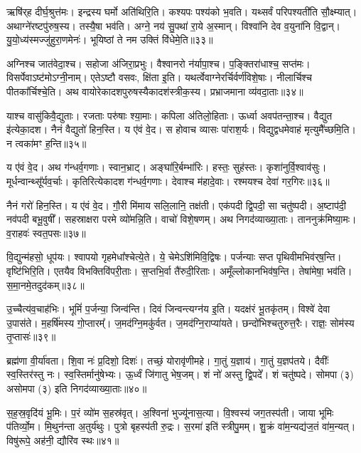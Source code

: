 ऋषि॑र्‌ह दीर्घ॒श्रुत्त॑मः। इन्द्रस्य घर्मो अति॑थिरि॒ति। 
कश्यपः पश्य॑को भ॒वति। यथ्सर्वं परिपश्यती॑ति सौ॒क्ष्म्यात्। 
अथाग्ने॑रष्टपु॑रुष॒स्य। तस्यै॒षा भव॑ति। 
अग्ने॒ नय॑ सु॒पथा॑ रा॒ये अ॒स्मान्। विश्वा॑नि देव व॒युना॑नि वि॒द्वान्। 
यु॒यो॒ध्य॑स्मज्जु॑हुरा॒णमेनः॑। भूयिष्ठां ते नम उक्तिं वि॑धेमे॒ति॥३३॥\anuvakamend


अग्निश्च जात॑वेदा॒श्च। सहोजा अ॑जिरा॒प्रभुः। वैश्वानरो न॑र्यापा॒श्च। 
प॒ङ्क्तिरा॑धाश्च॒ सप्त॑मः। विसर्पेवाऽष्ट॑मोऽग्नी॒नाम्। 
एतेऽष्टौ वसवः, क्षि॑ता इ॒ति। यथर्त्वेवाग्नेरर्चिर्वर्ण॑विशे॒षाः। 
नीलार्चिश्च पीतका᳚र्चिश्चे॒ति। अथ वायोरेकादशपुरुषस्यैका\-दश॑स्त्रीक॒स्य। 
प्रभ्राजमाना व्य॑वदा॒ताः॥३४॥


याश्च वासु॑किवै॒द्युताः। रजताः परु॑षाः श्या॒माः। कपिला अ॑तिलो॒हिताः। 
ऊर्ध्वा अवप॑तन्ता॒श्च। वैद्युत इ॑त्येका॒दश। नैनं वैद्युतो॑ हिन॒स्ति। 
य ए॑वं वे॒द। स होवाच व्यासः पा॑राश॒र्यः। 
विद्युद्वधमेवाहं मृत्युमै᳚च्छमि॒ति। न त्वका॑मꣳ ह॒न्ति॥३५॥


य ए॑वं वे॒द। अथ ग॑न्धर्व॒गणाः। स्वान॒भ्राट्। 
अङ्घा॑रि॒र्बम्भा॑रिः। हस्तः॒ सुह॑स्तः। कृशा॑नुर्वि॒श्वाव॑सुः। 
मूर्धन्वान्थ्सू᳚र्यव॒र्चाः। कृतिरित्येकादश ग॑न्धर्व॒गणाः। 
देवाश्च म॑हादे॒वाः। रश्मयश्च देवा॑ गर॒गिरः॥३६॥


नैनं गरो॑ हिन॒स्ति। य ए॑वं वे॒द। 
गौ॒री मि॑माय सलि॒लानि॒ तक्ष॑ती। एक॑पदी द्वि॒पदी॒ सा चतु॑ष्पदी। 
अ॒ष्टाप॑दी॒ नव॑पदी बभू॒वुषी᳚। सहस्राक्षरा परमे व्यो॑मन्नि॒ति। 
वाचो॑ विशे॒षणम्। अथ निगद॑व्याख्या॒ताः। 
ताननुक्र॑मिष्या॒मः। व॒राहवः॑ स्वत॒पसः॥३७॥

वि॒द्युन्म॑हसो॒ धूप॑यः। श्वापयो गृहमेधा᳚श्चेत्ये॒ते। 
ये॒ चेमेऽशि॑मिवि॒\-द्विषः। पर्जन्याः सप्त पृथिवीमभिव॑र्‌ष॒न्ति। 
वृष्टि॑भिरि॒ति। एतयैव विभक्तिवि॑परी॒ताः। स॒प्तभि॒र्वा तै॑रुदी॒रिताः। 
अमूँल्लोकान\-भिव॑\ur{}ष॒न्ति। तेषा॑मेषा॒ भव॑ति। स॒मा॒नमे॒तदुद॑कम्॥३८॥

उ॒च्चैत्य॑व॒चाह॑भिः। भूमिं॑ प॒र्जन्या॒ जिन्व॑न्ति। दिवं जिन्वन्त्यग्न॑य इ॒ति। 
यदक्ष॑रं भू॒तकृ॑तम्। विश्वे॑ देवा उ॒पास॑ते। म॒हर्\mbox{}षि॑मस्य गो॒प्तारम्᳚। 
ज॒मद॑ग्नि॒मकु॑र्वत। ज॒मद॑ग्नि॒\-राप्या॑यते। 
छन्दो॑भिश्चतुरुत्त॒रैः। राज्ञः॒ सोम॑स्य तृ॒प्तासः॑॥३९॥

ब्रह्म॑णा वी॒र्या॑वता। शि॒वा नः॑ प्र॒दिशो॒ दिशः॑। 
तच्छं॒ योरावृ॑णीमहे। गा॒तुं य॒ज्ञाय॑। गा॒तुं य॒ज्ञप॑तये। 
दैवीः᳚ स्व॒स्तिर॑स्तु नः। स्व॒स्तिर्मानु॑षेभ्यः। ऊ॒र्ध्वं जि॑गातु भेष॒जम्। 
शं नो॑ अस्तु द्वि॒पदे᳚। शं चतु॑ष्पदे। 
सोमपा (३) असोमपा (३) इति निगद॑व्याख्या॒ताः॥४०॥\anuvakamend


स॒ह॒स्र॒वृदि॑यं भू॒मिः। प॒रं व्यो॑म स॒हस्र॑वृत्। अ॒श्विना॑ भुज्यू॑नास॒त्या। 
वि॒श्वस्य॑ जग॒तस्प॑ती। जाया भूमिः प॑तिर्व्यो॒म। मि॒थुन॑न्ता अ॒तुर्य॑थुः। 
पुत्रो बृहस्प॑ती रु॒द्रः। स॒रमा॑ इति॑ स्त्रीपु॒मम्। 
शु॒क्रं वा॑म॒न्यद्य॑ज॒तं वा॑म॒न्यत्। विषु॑रूपे॒ अह॑नी॒ द्यौरि॑व स्थः॥४१॥



